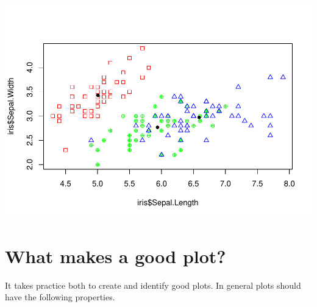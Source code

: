 \documentclass[
]{book}
\begin{document}
\includegraphics{_main_files/figure-latex/unnamed-chunk-191-1.pdf}

\hypertarget{what-makes-a-good-plot}{%
\section{What makes a good plot?}\label{what-makes-a-good-plot}}

It takes practice both to create and identify good plots. In general plots should have the following properties.
\end{document}
